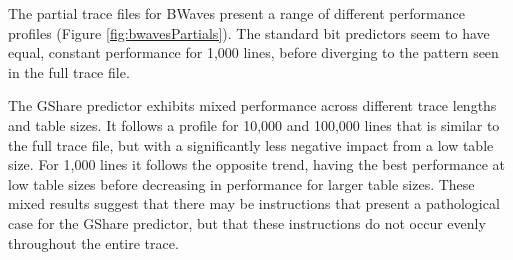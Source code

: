 \clearpage
The partial trace files for BWaves present a range of different performance profiles (Figure \ref{fig:bwavesPartials}). The standard bit predictors seem to have equal, constant performance for 1,000 lines, before diverging to the pattern seen in the full trace file.

The GShare predictor exhibits mixed performance across different trace lengths and table sizes. It follows a profile for 10,000 and 100,000 lines that is similar to the full trace file, but with a significantly less negative impact from a low table size. For 1,000 lines it follows the opposite trend, having the best performance at low table sizes before decreasing in performance for larger table sizes. These mixed results suggest that there may be instructions that present a pathological case for the GShare predictor, but that these instructions do not occur evenly throughout the entire trace.

